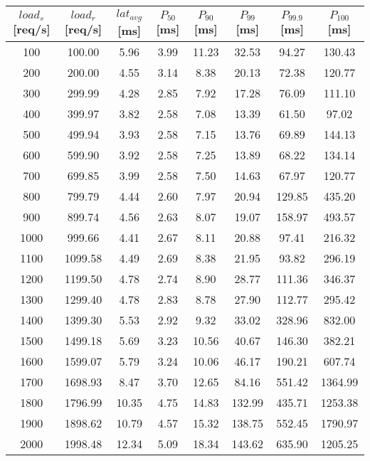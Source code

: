 \begin{table}[!h]
	\begin{adjustwidth}{-2cm}{-2cm}
		\begin{tabular}{|c|c|c|c|c|c|c|c|}
			\hline
			 $load_{s}$ [req/s] & $load_{r}$ [req/s] & $lat_{avg}$ [ms] & $P_{50}$ [ms] & $P_{90}$ [ms] & $P_{99}$ [ms] & $P_{99.9}$ [ms] & $P_{100}$ [ms] \\
			\hline
			100 & 100.00 & 5.96 & 3.99 & 11.23 & 32.53 & 94.27 & 130.43 \\ \hline
			200 & 200.00 & 4.55 & 3.14 & 8.38 & 20.13 & 72.38 & 120.77 \\ \hline
			300 & 299.99 & 4.28 & 2.85 & 7.92 & 17.28 & 76.09 & 111.10 \\ \hline
			400 & 399.97 & 3.82 & 2.58 & 7.08 & 13.39 & 61.50 & 97.02 \\ \hline
			500 & 499.94 & 3.93 & 2.58 & 7.15 & 13.76 & 69.89 & 144.13 \\ \hline
			600 & 599.90 & 3.92 & 2.58 & 7.25 & 13.89 & 68.22 & 134.14 \\ \hline
			700 & 699.85 & 3.99 & 2.58 & 7.50 & 14.63 & 67.97 & 120.77 \\ \hline
			800 & 799.79 & 4.44 & 2.60 & 7.97 & 20.94 & 129.85 & 435.20 \\ \hline
			900 & 899.74 & 4.56 & 2.63 & 8.07 & 19.07 & 158.97 & 493.57 \\ \hline
			1000 & 999.66 & 4.41 & 2.67 & 8.11 & 20.88 & 97.41 & 216.32 \\ \hline
			1100 & 1099.58 & 4.49 & 2.69 & 8.38 & 21.95 & 93.82 & 296.19 \\ \hline
			1200 & 1199.50 & 4.78 & 2.74 & 8.90 & 28.77 & 111.36 & 346.37 \\ \hline
			1300 & 1299.40 & 4.78 & 2.83 & 8.78 & 27.90 & 112.77 & 295.42 \\ \hline
			1400 & 1399.30 & 5.53 & 2.92 & 9.32 & 33.02 & 328.96 & 832.00 \\ \hline
			1500 & 1499.18 & 5.69 & 3.23 & 10.56 & 40.67 & 146.30 & 382.21 \\ \hline
			1600 & 1599.07 & 5.79 & 3.24 & 10.06 & 46.17 & 190.21 & 607.74 \\ \hline
			1700 & 1698.93 & 8.47 & 3.70 & 12.65 & 84.16 & 551.42 & 1364.99 \\ \hline
			1800 & 1796.99 & 10.35 & 4.75 & 14.83 & 132.99 & 435.71 & 1253.38 \\ \hline
			1900 & 1898.62 & 10.79 & 4.57 & 15.32 & 138.75 & 552.45 & 1790.97 \\ \hline
			2000 & 1998.48 & 12.34 & 5.09 & 18.34 & 143.62 & 635.90 & 1205.25 \\ \hline

\end{tabular}
\end{adjustwidth}
\end{table}
